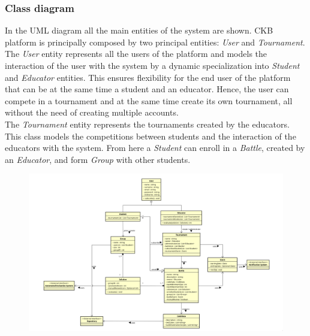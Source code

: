 \documentclass[../RASD.tex]{subfiles}
\begin{document}
    \subsubsection{Class diagram}\label{subsubsec:class_diagram}
    In the UML diagram all the main entities of the system are shown. 
    CKB platform is principally composed by two principal entities: \textit{User} and \textit{Tournament}. 
    The \textit{User} entity represents all the users of the platform and models the interaction of the user with the system by a dynamic specialization into \textit{Student} and \textit{Educator} entities.
    This ensures flexibility for the end user of the platform that can be at the same time a student and an educator.
    Hence, the user can compete in a tournament and at the same time create its own tournament, all without the need of creating multiple accounts.\\
    The \textit{Tournament} entity represents the tournaments created by the educators.
    This class models the competitions between students and the interaction of the educators with the system.
    From here a \textit{Student} can enroll in a \textit{Battle}, created by an \textit{Educator}, and form \textit{Group} with other students.
    \begin{figure}[h!]
        \centering
        \hspace*{-2cm}
        \includegraphics[width=1.2\textwidth]{../assets/section_2/class_diagram.png}
        \hspace*{2cm}
    \end{figure}
    \newpage
    \restoregeometry

\end{document}
